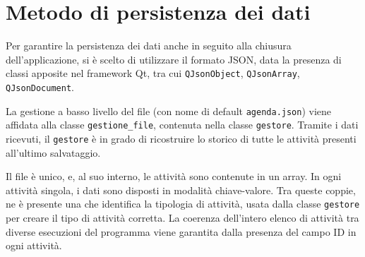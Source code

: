 \section{Metodo di persistenza dei dati}

Per garantire la persistenza dei dati anche in seguito alla chiusura dell'applicazione, si è
scelto di utilizzare il formato JSON, data la presenza di classi apposite nel framework Qt, tra cui
\texttt{QJsonObject}, \texttt{QJsonArray}, \texttt{QJsonDocument}.

La gestione a basso livello del file (con nome di default \texttt{agenda.json}) viene affidata
alla classe \texttt{gestione\_file}, contenuta nella classe \texttt{gestore}.
Tramite i dati ricevuti, il \texttt{gestore} è in grado di ricostruire lo storico di tutte
le attività presenti all'ultimo salvataggio.

Il file è unico, e, al suo interno, le attività sono contenute in un array. In ogni attività
singola, i dati sono disposti in modalità chiave-valore. Tra queste coppie, ne è presente una
che identifica la tipologia di attività, usata dalla classe \texttt{gestore} per creare il
tipo di attività corretta. La coerenza dell'intero elenco di attività tra diverse esecuzioni
del programma viene garantita dalla presenza del campo ID in ogni attività.